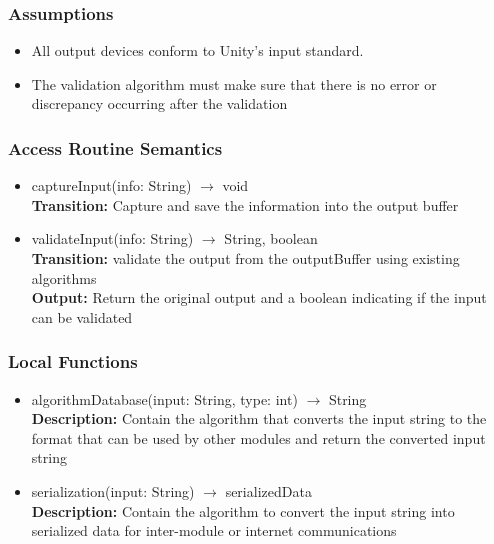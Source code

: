 \documentclass[12pt, titlepage]{article}
\begin{document}
\subsubsection{Assumptions}
\begin{itemize}
\item All output devices conform to Unity's input standard.
\item The validation algorithm must make sure that there is no error or discrepancy occurring after the validation
\end{itemize}

\subsubsection{Access Routine Semantics}

\begin{itemize}
\item captureInput(info: String) $\rightarrow$ void\\
\textbf{Transition:} Capture and save the information into the output buffer

\item validateInput(info: String) $\rightarrow$ String, boolean\\
\textbf{Transition:} validate the output from the outputBuffer using existing algorithms\\
\textbf{Output:} Return the original output and a boolean indicating if the input can be validated


\end{itemize}


\subsubsection{Local Functions}
\begin{itemize}
\item algorithmDatabase(input: String, type: int) $\rightarrow$ String\\
\textbf{Description:} Contain the algorithm that converts the input string to the format that can be used by other modules and return the converted input string

\item serialization(input: String) $\rightarrow$ serializedData\\
\textbf{Description:} Contain the algorithm to convert the input string into serialized data for inter-module or internet communications
\end{itemize}
\end{document}
